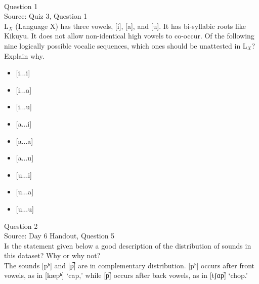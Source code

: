 \documentclass[12pt]{article}
\begin{document}
\newpage

\begin{center}
\textbf{{\color{red}{\HUGE END OF EXAM}}}\\

\end{center}
\newpage

\begin{center}
\textbf{{\color{blue}{\HUGE START OF EXAM\\}}}

\textbf{{\color{blue}{\HUGE Student ID: 3514\\}}}

\textbf{{\color{blue}{\HUGE 3:30 - 3:45 PM\\}}}

\end{center}
\newpage

{\large Question 1}\\

Source: Quiz 3, Question 1\\

L$_X$ (Language X) has three vowels, [i], [a], and [u]. It has bi-syllabic roots like Kikuyu. It does not allow non-identical high vowels to co-occur. Of the following nine logically possible vocalic sequences, which ones should be unattested in L$_X$? Explain why.\\

\begin{itemize} \item {[i...i]} \item {[i...a]} \item {[i...u]} \item {[a...i]} \item {[a...a]} \item {[a...u]} \item {[u...i]} \item {[u...a]} \item {[u...u]} \end{itemize}


\newpage

{\large Question 2}\\

Source: Day 6 Handout, Question 5\\

Is the statement given below a good description of the distribution of sounds in this dataset? Why or why not?\\

The sounds {[pʰ]} and {[p̚]} are in complementary distribution. {[pʰ]} occurs after front vowels, as in {[kæpʰ]} ‘cap,’ while {[p̚]} occurs after back vowels, as in {[tʃɑp̚]} ‘chop.’
\end{document}
